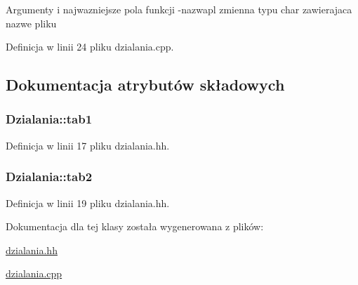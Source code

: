 Argumenty i najwazniejsze pola funkcji -\/nazwapl zmienna typu char zawierajaca nazwe pliku 

Definicja w linii 24 pliku dzialania.\-cpp.



\subsection{Dokumentacja atrybutów składowych}
\hypertarget{class_dzialania_aa1cf12383b1e7fe159856ff7a29216fc}{
\subsubsection[{tab1}]{ Dzialania\-::tab1\hspace{0.3cm}{\ttfamily [private]}}}\label{class_dzialania_aa1cf12383b1e7fe159856ff7a29216fc}


Definicja w linii 17 pliku dzialania.\-hh.

\hypertarget{class_dzialania_a63fcc04c8e704850ceec908ed61b408a}{
\subsubsection[{tab2}]{ Dzialania\-::tab2\hspace{0.3cm}{\ttfamily [private]}}}\label{class_dzialania_a63fcc04c8e704850ceec908ed61b408a}


Definicja w linii 19 pliku dzialania.\-hh.



Dokumentacja dla tej klasy została wygenerowana z plików\-:\begin{DoxyCompactItemize}
\item 
\hyperlink{dzialania_8hh}{dzialania.\-hh}\item 
\hyperlink{dzialania_8cpp}{dzialania.\-cpp}\end{DoxyCompactItemize}
